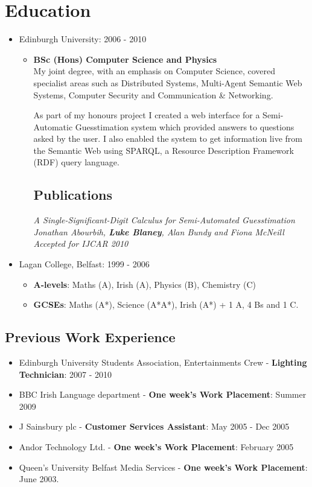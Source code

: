 \documentclass[a4paper]{article}
\begin{document}
\section*{Education}
\begin{itemize}

\item Edinburgh University: 2006 - 2010 \begin{itemize}\item {\bf BSc (Hons) Computer Science and Physics}\\
My joint degree, with an emphasis on Computer Science, covered specialist areas such as Distributed Systems, Multi-Agent Semantic Web Systems, Computer Security and Communication \& Networking.

As part of my honours project I created a web interface for a Semi-Automatic Guesstimation system which provided answers to questions asked by the user.   I also enabled the system to get information live from the Semantic Web using SPARQL, a Resource Description Framework (RDF) query language.
\subsection*{Publications}
\em A Single-Significant-Digit Calculus for Semi-Automated Guesstimation \em\\
Jonathan Abourbih, {\bf Luke Blaney}, Alan Bundy and Fiona McNeill\\
Accepted for IJCAR 2010
\end{itemize}

\item Lagan College, Belfast: 1999 - 2006
\begin{itemize}\item {\bf A-levels}: Maths (A), Irish (A), Physics (B), Chemistry (C)
\item {\bf GCSEs}: Maths (A*), Science (A*A*), Irish (A*) + 1 A, 4 Bs and 1 C.
\end{itemize}

\end{itemize}

\subsection*{Previous Work Experience}
\begin{itemize}

\item Edinburgh University Students Association, Entertainments Crew - {\bf Lighting Technician}: 2007 - 2010
\item BBC Irish Language department - {\bf One week's Work Placement}: Summer 2009
\item J Sainsbury plc - {\bf Customer Services Assistant}: May 2005 - Dec 2005
\item Andor Technology Ltd. - {\bf One week's Work Placement}:  February 2005
\item Queen's University Belfast Media Services - {\bf One week's Work Placement}:  June 2003.

\end{itemize}
\end{document}
